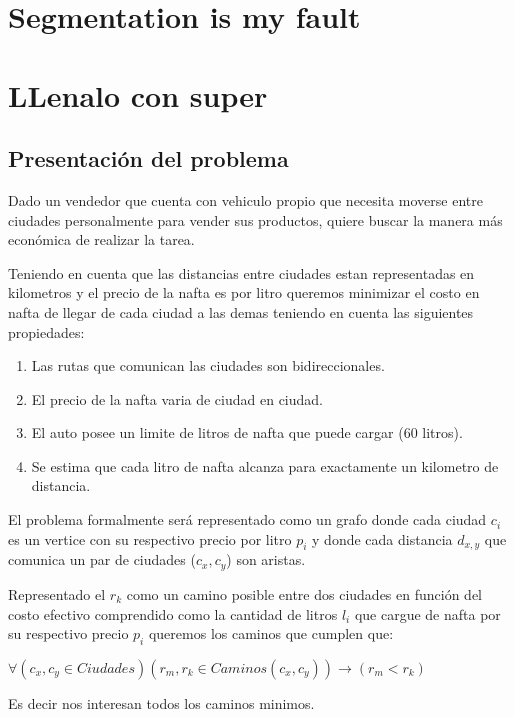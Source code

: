 \documentclass[12pt]{article}
\begin{document}
\section{Segmentation is my fault}



\section{LLenalo con super}

\subsection*{Presentación del problema}
Dado un vendedor que cuenta con vehiculo propio que necesita moverse entre ciudades personalmente para vender sus productos, quiere buscar la manera más económica de realizar la tarea.

Teniendo en cuenta que las distancias entre ciudades estan representadas en kilometros y el precio de la nafta es por litro queremos minimizar el costo en nafta de llegar de cada ciudad a las demas teniendo en cuenta las siguientes propiedades: 

\begin{enumerate}
    \item Las rutas que comunican las ciudades son bidireccionales.
    \item El precio de la nafta varia de ciudad en ciudad.
    \item El auto posee un limite de litros de nafta que puede cargar (60 litros).
    \item Se estima que cada litro de nafta alcanza para exactamente un kilometro de distancia.
\end{enumerate}

El problema formalmente será representado como un grafo donde cada ciudad
 $c_i$ es un vertice con su respectivo precio por litro $p_i$ y donde 
 cada distancia $d_{x,y}$ que comunica un par de ciudades ($c_x, c_y$) son aristas.

Representado el $r_k$ como un camino posible entre dos ciudades en función del costo efectivo
comprendido como la cantidad de litros $l_i$ que cargue de nafta por su respectivo precio $p_i$ queremos los caminos que cumplen que:

$\forall(c_x, c_y \in Ciudades)(r_{m}, r_k \in Caminos(c_x,c_y))\rightarrow(r_{m} < r_k)$

Es decir nos interesan todos los caminos minimos.
\end{document}
